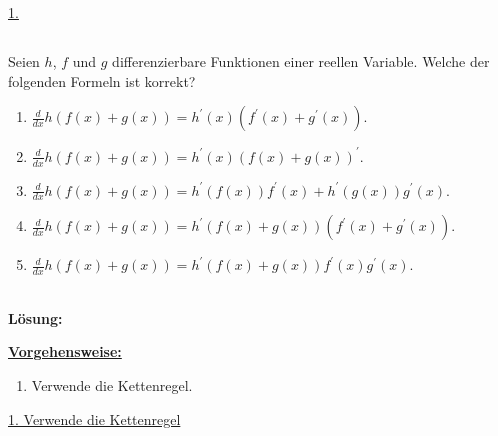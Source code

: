 \underline{1. }\\



 \newpage

\subsection*{}
Seien $h$, $f$ und $g$ differenzierbare Funktionen einer reellen Variable. Welche der folgenden Formeln ist korrekt?
\renewcommand{\labelenumi}{(\alph{enumi})}
\begin{enumerate}
	\item 
	$ \frac{d}{dx}h(f(x) + g(x)) = h^\prime(x) ( f^\prime(x) + g^\prime(x))$.
	\item 
	$ \frac{d}{dx}h(f(x) + g(x)) = h^\prime(x) ( f(x) + g(x))^\prime$.
	\item
	$ \frac{d}{dx}h(f(x) + g(x)) = h^\prime(f(x))  f^\prime(x) + h^\prime(g(x)) g^\prime(x)$.
	\item
	$ \frac{d}{dx}h(f(x) + g(x)) = h^\prime(f(x) + g(x))  (f^\prime(x) +  g^\prime(x) )$.
	\item
	$ \frac{d}{dx}h(f(x) + g(x)) = h^\prime(f(x) + g(x))  f^\prime(x)  g^\prime(x)$.
\end{enumerate}
\ \\
\textbf{Lösung:}
\begin{mdframed}
\underline{\textbf{Vorgehensweise:}}
\renewcommand{\labelenumi}{\theenumi.}
\begin{enumerate}
\item Verwende die Kettenregel.
\end{enumerate}
\end{mdframed}

\underline{1. Verwende die Kettenregel}\\

 


\newpage
